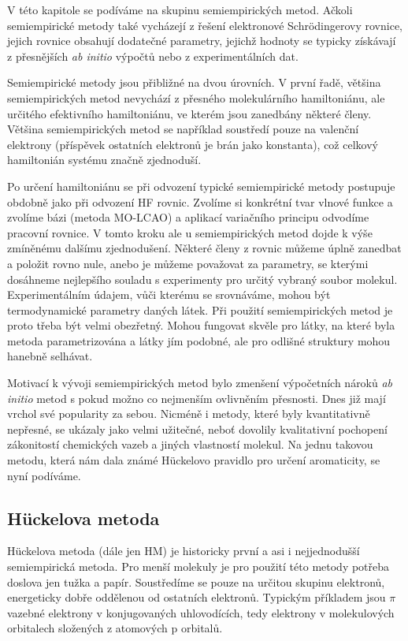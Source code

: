V této kapitole se podíváme na skupinu semiempirických metod. Ačkoli semiempirické metody také vycházejí z řešení elektronové Schr\"{o}dingerovy rovnice, jejich rovnice obsahují dodatečné parametry, jejichž hodnoty se typicky získávají z přesnějších \textit{ab initio} výpočtů nebo z experimentálních dat.

Semiempirické metody jsou přibližné na dvou úrovních. V první řadě, většina semiempirických metod nevychází z přesného molekulárního hamiltoniánu, ale určitého efektivního hamiltoniánu, ve kterém jsou zanedbány některé členy. Většina semiempirických metod se například soustředí pouze na valenční elektrony (příspěvek ostatních elektronů je brán jako konstanta), což celkový hamiltonián systému značně zjednoduší. 

Po určení hamiltoniánu se při odvození typické semiempirické metody postupuje obdobně jako při odvození HF rovnic. Zvolíme si konkrétní tvar vlnové funkce a zvolíme bázi (metoda MO-LCAO) a aplikací variačního principu odvodíme pracovní rovnice. V tomto kroku ale u semiempirických metod dojde k výše zmíněnému dalšímu zjednodušení. Některé členy z rovnic můžeme úplně zanedbat a položit rovno nule, anebo je můžeme považovat za parametry, se kterými dosáhneme nejlepšího souladu s experimenty pro určitý vybraný soubor molekul. Experimentálním údajem, vůči kterému se srovnáváme, mohou být termodynamické parametry daných látek. Při použití semiempirických metod je proto třeba být velmi obezřetný. Mohou fungovat skvěle pro látky, na které byla metoda parametrizována a látky jím podobné, ale pro odlišné struktury mohou hanebně selhávat.

Motivací k vývoji semiempirických metod bylo zmenšení výpočetních nároků \textit{ab initio} metod s pokud možno co nejmenším ovlivněním přesnosti. Dnes již mají vrchol své popularity za sebou. Nicméně i metody, které byly kvantitativně nepřesné, se ukázaly jako velmi užitečné, neboť dovolily kvalitativní pochopení zákonitostí chemických vazeb a jiných vlastností molekul. Na jednu takovou metodu, která nám dala známé H\"{u}ckelovo pravidlo  pro určení aromaticity, se nyní podíváme.

\subsection{H\"{u}ckelova metoda}

H\"{u}ckelova metoda (dále jen HM) je historicky první a asi i nejjednodušší semiempirická metoda. Pro menší molekuly je pro použití této metody potřeba doslova jen tužka a papír. Soustředíme se pouze na určitou skupinu elektronů, energeticky dobře oddělenou od ostatních elektronů. Typickým příkladem jsou $\pi$ vazebné elektrony v konjugovaných uhlovodících,
tedy elektrony v molekulových orbitalech složených z atomových p orbitalů.
 

